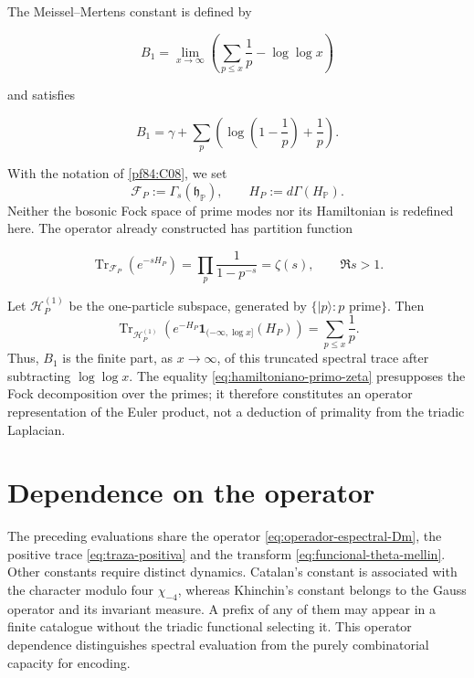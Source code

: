 The Meissel--Mertens constant is defined by

\begin{equation}
 B_1=\lim_{x\to\infty}
 \left(\sum_{p\leq x}\frac1p-\log\log x\right)
 \label{eq:meissel-mertens-def}
\end{equation}

and satisfies

\begin{equation}
 B_1=\gamma+
 \sum_p\left(\log\!\left(1-\frac1p\right)+\frac1p\right).
 \label{eq:meissel-mertens-euler}
\end{equation}

With the notation of \cref{pf84:C08}, we set
\[
 \mathcal F_P:=\Gamma_s(\mathfrak h_{\mathbb P}),
 \qquad
 H_P:=d\Gamma(H_{\mathbb P}).
\]
Neither the bosonic Fock space of prime modes nor its Hamiltonian is redefined here. The
operator already constructed has partition function

\begin{equation}
 \operatorname{Tr}_{\mathcal F_P}(e^{-sH_P})
 =\prod_p\frac1{1-p^{-s}}
 =\zeta(s),
 \qquad \Re s>1.
 \label{eq:hamiltoniano-primo-zeta}
\end{equation}

Let \(\mathcal H_P^{(1)}\) be the one-particle subspace, generated by
\(\{|p\rangle:p\text{ prime}\}\). Then
\[
 \operatorname{Tr}_{\mathcal H_P^{(1)}}\!\left(
 e^{-H_P}\mathbf 1_{(-\infty,\log x]}(H_P)\right)
 =\sum_{p\leq x}\frac1p.
\]
Thus, \(B_1\) is the finite part, as \(x\to\infty\), of this truncated spectral
trace after subtracting \(\log\log x\). The equality
\eqref{eq:hamiltoniano-primo-zeta} presupposes the Fock decomposition over
the primes; it therefore constitutes an operator representation of the Euler
product, not a deduction of primality from the triadic
Laplacian.

\section{Dependence on the operator}

The preceding evaluations share the operator
\eqref{eq:operador-espectral-Dm}, the positive trace
\eqref{eq:traza-positiva} and the transform
\eqref{eq:funcional-theta-mellin}. Other constants require distinct
dynamics. Catalan's constant is associated with the character modulo four
$\chi_{-4}$, whereas Khinchin's constant belongs to the Gauss
operator and its invariant measure. A prefix of any of them may
appear in a finite catalogue without the triadic functional selecting it.
This operator dependence distinguishes spectral evaluation from the
purely combinatorial capacity for encoding.
